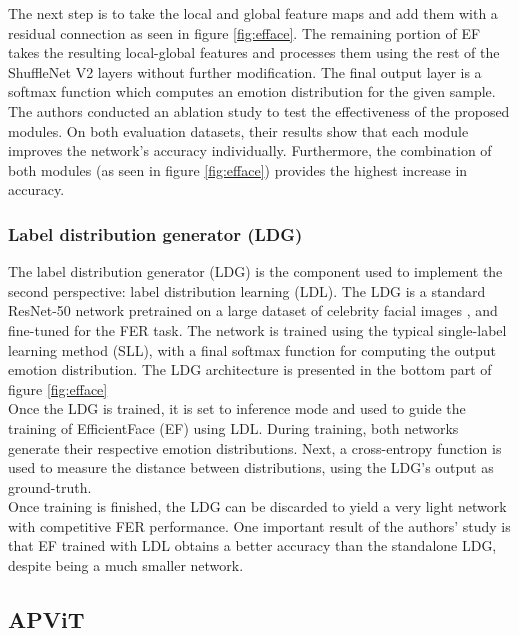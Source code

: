 The next step is to take the local and global feature maps and add them with a residual connection as seen in figure \ref{fig:efface}.
The remaining portion of EF takes the resulting local-global features and processes them using the rest of the ShuffleNet V2 layers without further modification.
The final output layer is a softmax function which computes an emotion distribution for the given sample.\\

The authors conducted an ablation study to test the effectiveness of the proposed modules.
On both evaluation datasets, their results show that each module improves the network's accuracy individually.
Furthermore, the combination of both modules (as seen in figure \ref{fig:efface}) provides the highest increase in accuracy.

\subsubsection{Label distribution generator (LDG)}

The label distribution generator (LDG) is the component used to implement the second perspective: label distribution learning (LDL).
The LDG is a standard ResNet-50 \cite{he2016resnet} network pretrained on a large dataset of celebrity facial images \cite{guo2016msceleb}, and fine-tuned for the FER task.
The network is trained using the typical single-label learning method (SLL), with a final softmax function for computing the output emotion distribution.
The LDG architecture is presented in the bottom part of figure \ref{fig:efface} \\

Once the LDG is trained, it is set to inference mode and used to guide the training of EfficientFace (EF) using LDL.
During training, both networks generate their respective emotion distributions.
Next, a cross-entropy function is used to measure the distance between distributions, using the LDG's output as ground-truth.\\

Once training is finished, the LDG can be discarded to yield a very light network with competitive FER performance.
One important result of the authors' study is that EF trained with LDL obtains a better accuracy than the standalone LDG, despite being a much smaller network.


\subsection{APViT}\label{section:apvit}

